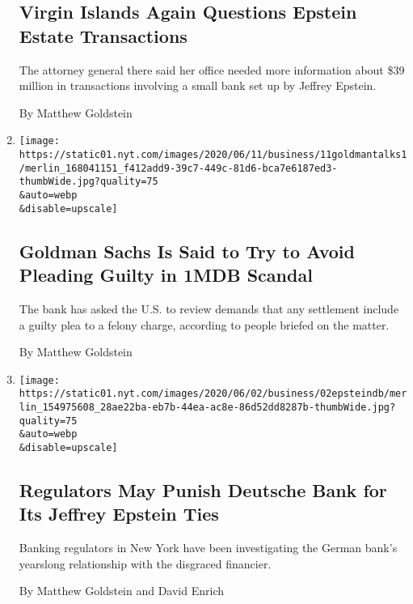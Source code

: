 \begin{enumerate}
{  \subsection{Virgin Islands Again Questions Epstein Estate
  Transactions}\label{virgin-islands-again-questions-epstein-estate-transactions}}

  The attorney general there said her office needed more information
  about \$39 million in transactions involving a small bank set up by
  Jeffrey Epstein.

  By Matthew Goldstein
\item
  \href{/2020/06/11/business/goldman-sachs-1mdb-malaysia.html}{}

  \texttt{[image: https://static01.nyt.com/images/2020/06/11/business/11goldmantalks1/merlin\_168041151\_f412add9-39c7-449c-81d6-bca7e6187ed3-thumbWide.jpg?quality=75\\\&auto=webp\\\&disable=upscale]}

  \hypertarget{goldman-sachs-is-said-to-try-to-avoid-pleading-guilty-in-1mdb-scandal}{%
  \subsection{Goldman Sachs Is Said to Try to Avoid Pleading Guilty in
  1MDB
  Scandal}\label{goldman-sachs-is-said-to-try-to-avoid-pleading-guilty-in-1mdb-scandal}}

  The bank has asked the U.S. to review demands that any settlement
  include a guilty plea to a felony charge, according to people briefed
  on the matter.

  By Matthew Goldstein
\item
  \href{/2020/06/02/business/jeffrey-epstein-deutsche-bank.html}{}

  \texttt{[image: https://static01.nyt.com/images/2020/06/02/business/02epsteindb/merlin\_154975608\_28ae22ba-eb7b-44ea-ac8e-86d52dd8287b-thumbWide.jpg?quality=75\\\&auto=webp\\\&disable=upscale]}

  \hypertarget{regulators-may-punish-deutsche-bank-for-its-jeffrey-epstein-ties}{%
  \subsection{Regulators May Punish Deutsche Bank for Its Jeffrey
  Epstein
  Ties}\label{regulators-may-punish-deutsche-bank-for-its-jeffrey-epstein-ties}}

  Banking regulators in New York have been investigating the German
  bank's yearslong relationship with the disgraced financier.

  By Matthew Goldstein and David Enrich
\end{enumerate}

